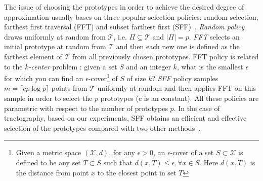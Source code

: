 The issue of choosing the prototypes in order to achieve the desired degree of approximation usually bases on three popular selection policies: random selection, farthest first traversal (FFT) and subset farthest first (SFF)~\cite{turnbull2005fast}. 
\textit{Random policy} draws uniformly at random from $\mathcal{T}$, i.e. $\Pi \subseteq \mathcal{T}$ and $|\Pi|=p$.
\textit{FFT} selects an initial prototype at random from $\mathcal{T}$ and then each new one is defined as the farthest element of $\mathcal{T}$ from all previously chosen prototypes. 
FFT policy is related to the \emph{$k$-center} problem
: given a set $S$ and an integer $k$, what is the smallest $\epsilon$ for which you can find an $\epsilon$-cover\footnote{Given a metric space $(\mathcal{X},d)$, for any $\epsilon > 0$, an $\epsilon$-cover of a set $S \subset \mathcal{X}$ is defined to be any set $T \subset S$ such that $d(x,T) \leq \epsilon, \forall x \in S$. Here $d(x,T)$ is the distance from point $x$ to the closest point in set $T$} of $S$ of size $k$? \textit{SFF} policy samples $m = \lceil c p \log p \rceil$ points from $\mathcal{T}$ uniformly at random and then applies FFT on this sample in order to select the $p$ prototypes (c is an constant). All these policies are parametric with respect to the number of prototypes $p$. In the case of tractography, based on our experiments, SFF obtains an efficient and effective selection of the prototypes compared with two other methods~\cite{olivetti2012approximation}.
